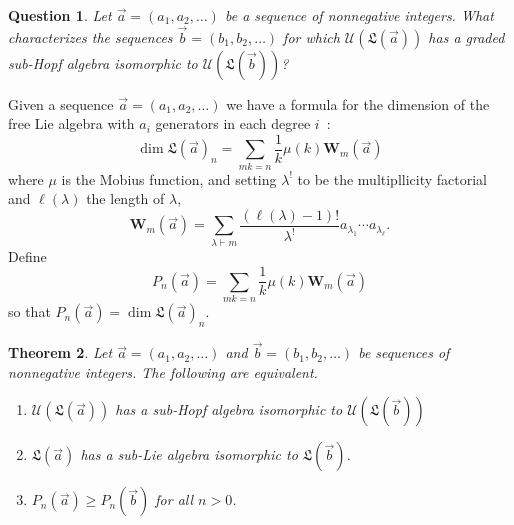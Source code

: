 \documentclass[11pt]{amsart}
\newtheorem{theorem}{Theorem}[section]
\newtheorem{question}[theorem]{Question}
\theoremstyle{definition}
\numberwithin{equation}{section}
\begin{document}
\begin{question}
Let $\vec{a} = (a_{1}, a_{2}, \ldots)$ be a sequence of nonnegative integers.  What characterizes the sequences $\vec{b} = (b_{1}, b_{2}, \ldots)$ for which $\mathcal{U}(\mathfrak{L}(\vec{a}))$ has a graded sub-Hopf algebra isomorphic to $\mathcal{U}(\mathfrak{L}(\vec{b}))$?
\end{question}



Given a sequence $\vec{a} = (a_1,a_2, \ldots)$ we have a formula for the dimension of the free Lie algebra with $a_i$ generators in each degree $i$~\cite[Theorem 2.2]{KK95}:
\[
\dim \mathfrak{L}(\vec{a})_n = \sum_{mk=n} \frac{1}{k}\mu (k) \mathbf{W}_m(\vec{a})
\]
where $\mu$ is the Mobius function, and setting $\lambda^!$ to be the multipllicity factorial and $\ell(\lambda)$ the length of $\lambda$,
\[
\mathbf{W}_m(\vec{a}) = \sum_{\lambda \vdash m} \frac{(\ell(\lambda)-1)!}{\lambda^!}a_{\lambda_1} \cdots a_{\lambda_{\ell}}.
\]
Define 
\[
P_n(\vec{a}) = \sum_{mk=n} \frac{1}{k}\mu (k) \mathbf{W}_m(\vec{a})
\]
so that $P_n(\vec{a}) = \dim \mathfrak{L}(\vec{a})_n$.

\begin{theorem}
\label{thm:subclassification1}
    Let $\vec{a} = (a_{1}, a_{2}, \ldots)$ and $\vec{b} = (b_{1}, b_{2}, \ldots)$ be sequences of nonnegative integers. The following are equivalent.
    \begin{enumerate}
        \item $\mathcal{U}(\mathfrak{L}(\vec{a}))$ has a sub-Hopf algebra isomorphic to $\mathcal{U}(\mathfrak{L}(\vec{b}))$
        \item $\mathfrak{L}(\vec{a})$ has a sub-Lie algebra isomorphic to $\mathfrak{L}(\vec{b})$.
        \item $P_n(\vec{a}) \geq P_n(\vec{b})$ for all $n > 0$.
    \end{enumerate}
\end{theorem}
\end{document}
